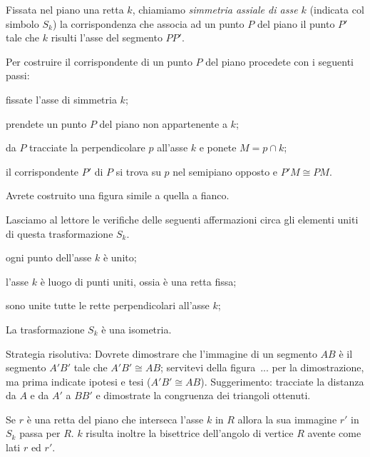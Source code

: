\begin{definizione}
Fissata nel piano una retta $k$, chiamiamo \emph{simmetria assiale di asse $k$} (indicata col simbolo $S_k$) la corrispondenza che associa ad un punto $P$ del piano il punto $P'$ tale che $k$ risulti l'asse del segmento $PP'$.
\end{definizione}

Per costruire il corrispondente di un punto $P$ del piano procedete con i seguenti passi:
\begin{enumerate*}
\item fissate l'asse di simmetria $k$;
\item prendete un punto $P$ del piano non appartenente a $k$;
\item da $P$ tracciate la perpendicolare $p$ all'asse $k$ e ponete $M=p\cap k$;
\item il corrispondente $P'$ di $P$ si trova su $p$ nel semipiano opposto e $P'M\cong PM$.
\end{enumerate*}

Avrete costruito una figura simile a quella a fianco.

Lasciamo al lettore le verifiche delle seguenti affermazioni circa gli elementi uniti di questa trasformazione $S_k$.
\begin{itemize*}
\item ogni punto dell'asse $k$ è unito;
\item l'asse $k$ è luogo di punti uniti, ossia è una retta fissa;
\item sono unite tutte le rette perpendicolari all'asse $k$;
\end{itemize*}

\begin{teorema}\label{teo:8.3}
La trasformazione $S_k$ è una isometria.
\end{teorema}

Strategia risolutiva:
Dovrete dimostrare che l'immagine di un segmento $AB$ è il segmento $A'B'$ tale che $A'B'\cong AB$; servitevi della figura~... per la dimostrazione, ma prima indicate ipotesi e tesi ($A'B'\cong AB$).
Suggerimento: tracciate la distanza da $A$ e da $A'$ a $BB'$ e dimostrate la congruenza dei triangoli ottenuti.

\begin{teorema}\label{teo:8.4}
Se $r$ è una retta del piano che interseca l'asse $k$ in $R$ allora la sua immagine $r'$ in $S_k$ passa per $R$. $k$ risulta inoltre la bisettrice dell'angolo di vertice $R$ avente come lati $r$ ed $r'$.
\end{teorema}

